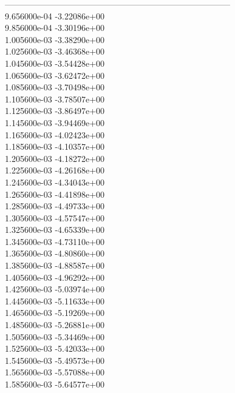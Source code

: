 --------------------------------------------------------------------------------\\ 	9.656000e-04	-3.22086e+00	\\ 	9.856000e-04	-3.30196e+00	\\ 	1.005600e-03	-3.38290e+00	\\ 	1.025600e-03	-3.46368e+00	\\ 	1.045600e-03	-3.54428e+00	\\ 	1.065600e-03	-3.62472e+00	\\ 	1.085600e-03	-3.70498e+00	\\ 	1.105600e-03	-3.78507e+00	\\ 	1.125600e-03	-3.86497e+00	\\ 	1.145600e-03	-3.94469e+00	\\ 	1.165600e-03	-4.02423e+00	\\ 	1.185600e-03	-4.10357e+00	\\ 	1.205600e-03	-4.18272e+00	\\ 	1.225600e-03	-4.26168e+00	\\ 	1.245600e-03	-4.34043e+00	\\ 	1.265600e-03	-4.41898e+00	\\ 	1.285600e-03	-4.49733e+00	\\ 	1.305600e-03	-4.57547e+00	\\ 	1.325600e-03	-4.65339e+00	\\ 	1.345600e-03	-4.73110e+00	\\ 	1.365600e-03	-4.80860e+00	\\ 	1.385600e-03	-4.88587e+00	\\ 	1.405600e-03	-4.96292e+00	\\ 	1.425600e-03	-5.03974e+00	\\ 	1.445600e-03	-5.11633e+00	\\ 	1.465600e-03	-5.19269e+00	\\ 	1.485600e-03	-5.26881e+00	\\ 	1.505600e-03	-5.34469e+00	\\ 	1.525600e-03	-5.42033e+00	\\ 	1.545600e-03	-5.49573e+00	\\ 	1.565600e-03	-5.57088e+00	\\ 	1.585600e-03	-5.64577e+00	\\ \hline
